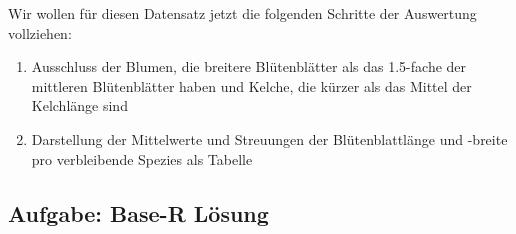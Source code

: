 \documentclass[
]{book}
\newenvironment{Shaded}{\begin{snugshade}}{\end{snugshade}}
\newcommand{\AttributeTok}[1]{\textcolor[rgb]{0.77,0.63,0.00}{#1}}
\newcommand{\DecValTok}[1]{\textcolor[rgb]{0.00,0.00,0.81}{#1}}
\newcommand{\FloatTok}[1]{\textcolor[rgb]{0.00,0.00,0.81}{#1}}
\newcommand{\FunctionTok}[1]{\textcolor[rgb]{0.00,0.00,0.00}{#1}}
\newcommand{\NormalTok}[1]{#1}
\newcommand{\OtherTok}[1]{\textcolor[rgb]{0.56,0.35,0.01}{#1}}
\newcommand{\SpecialCharTok}[1]{\textcolor[rgb]{0.00,0.00,0.00}{#1}}
\newcommand{\StringTok}[1]{\textcolor[rgb]{0.31,0.60,0.02}{#1}}
\begin{document}
Wir wollen für diesen Datensatz jetzt die folgenden Schritte der Auswertung vollziehen:

\begin{enumerate}
\def\labelenumi{\arabic{enumi}.}
\item
  Ausschluss der Blumen, die breitere Blütenblätter als das 1.5-fache der mittleren Blütenblätter haben und Kelche, die kürzer als das Mittel der Kelchlänge sind
\item
  Darstellung der Mittelwerte und Streuungen der Blütenblattlänge und -breite pro verbleibende Spezies als Tabelle
\end{enumerate}

\hypertarget{aufgabe-base-r-luxf6sung}{%
\subsection{Aufgabe: Base-R Lösung}\label{aufgabe-base-r-luxf6sung}}

\begin{Shaded}
\end{Shaded}
\end{document}
